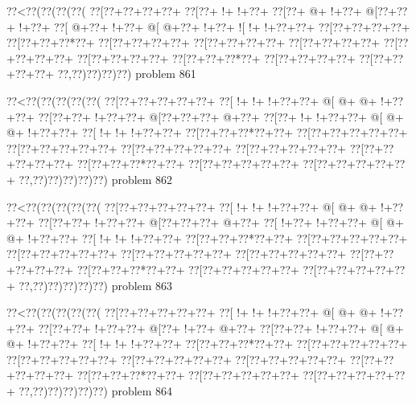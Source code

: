 \vbox{\vbox{\goo
\0??<\0??(\0??(\0??(\0??(
\0??[\0??+\0??+\0??+\0??+
\0??[\0??+\- !+\- !+\0??+
\0??[\0??+\- @+\- !+\0??+
\- @[\0??+\0??+\- !+\0??+
\0??[\- @+\0??+\- !+\0??+
\- @[\- @+\0??+\- !+\0??+
\- ![\- !+\- !+\0??+\0??+
\0??[\0??+\0??+\0??+\0??+
\0??[\0??+\0??+\0??*\0??+
\0??[\0??+\0??+\0??+\0??+
\0??[\0??+\0??+\0??+\0??+
\0??[\0??+\0??+\0??+\0??+
\0??[\0??+\0??+\0??+\0??+
\0??[\0??+\0??+\0??+\0??+
\0??[\0??+\0??+\0??*\0??+
\0??[\0??+\0??+\0??+\0??+
\0??[\0??+\0??+\0??+\0??+
\0??,\0??)\0??)\0??)\0??)
}
\hfil problem 861\hfil\break
}

\vbox{\vbox{\goo
\0??<\0??(\0??(\0??(\0??(\0??(
\0??[\0??+\0??+\0??+\0??+\0??+
\0??[\- !+\- !+\- !+\0??+\0??+
\- @[\- @+\- @+\- !+\0??+\0??+
\0??[\0??+\0??+\- !+\0??+\0??+
\- @[\0??+\0??+\0??+\- @+\0??+
\0??[\0??+\- !+\- !+\0??+\0??+
\- @[\- @+\- @+\- !+\0??+\0??+
\0??[\- !+\- !+\- !+\0??+\0??+
\0??[\0??+\0??+\0??*\0??+\0??+
\0??[\0??+\0??+\0??+\0??+\0??+
\0??[\0??+\0??+\0??+\0??+\0??+
\0??[\0??+\0??+\0??+\0??+\0??+
\0??[\0??+\0??+\0??+\0??+\0??+
\0??[\0??+\0??+\0??+\0??+\0??+
\0??[\0??+\0??+\0??*\0??+\0??+
\0??[\0??+\0??+\0??+\0??+\0??+
\0??[\0??+\0??+\0??+\0??+\0??+
\0??,\0??)\0??)\0??)\0??)\0??)
}
\hfil problem 862\hfil\break
}

\vbox{\vbox{\goo
\0??<\0??(\0??(\0??(\0??(\0??(
\0??[\0??+\0??+\0??+\0??+\0??+
\0??[\- !+\- !+\- !+\0??+\0??+
\- @[\- @+\- @+\- !+\0??+\0??+
\0??[\0??+\0??+\- !+\0??+\0??+
\- @[\0??+\0??+\0??+\- @+\0??+
\0??[\- !+\0??+\- !+\0??+\0??+
\- @[\- @+\- @+\- !+\0??+\0??+
\0??[\- !+\- !+\- !+\0??+\0??+
\0??[\0??+\0??+\0??*\0??+\0??+
\0??[\0??+\0??+\0??+\0??+\0??+
\0??[\0??+\0??+\0??+\0??+\0??+
\0??[\0??+\0??+\0??+\0??+\0??+
\0??[\0??+\0??+\0??+\0??+\0??+
\0??[\0??+\0??+\0??+\0??+\0??+
\0??[\0??+\0??+\0??*\0??+\0??+
\0??[\0??+\0??+\0??+\0??+\0??+
\0??[\0??+\0??+\0??+\0??+\0??+
\0??,\0??)\0??)\0??)\0??)\0??)
}
\hfil problem 863\hfil\break
}

\vbox{\vbox{\goo
\0??<\0??(\0??(\0??(\0??(\0??(
\0??[\0??+\0??+\0??+\0??+\0??+
\0??[\- !+\- !+\- !+\0??+\0??+
\- @[\- @+\- @+\- !+\0??+\0??+
\0??[\0??+\0??+\- !+\0??+\0??+
\- @[\0??+\- !+\0??+\- @+\0??+
\0??[\0??+\0??+\- !+\0??+\0??+
\- @[\- @+\- @+\- !+\0??+\0??+
\0??[\- !+\- !+\- !+\0??+\0??+
\0??[\0??+\0??+\0??*\0??+\0??+
\0??[\0??+\0??+\0??+\0??+\0??+
\0??[\0??+\0??+\0??+\0??+\0??+
\0??[\0??+\0??+\0??+\0??+\0??+
\0??[\0??+\0??+\0??+\0??+\0??+
\0??[\0??+\0??+\0??+\0??+\0??+
\0??[\0??+\0??+\0??*\0??+\0??+
\0??[\0??+\0??+\0??+\0??+\0??+
\0??[\0??+\0??+\0??+\0??+\0??+
\0??,\0??)\0??)\0??)\0??)\0??)
}
\hfil problem 864\hfil\break
}

